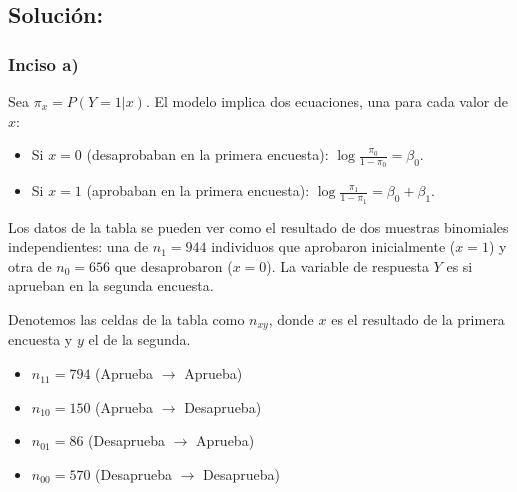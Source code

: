 \documentclass[paper=letter, fontsize=11pt]{scrartcl}\usepackage[]{graphicx}\usepackage[]{xcolor}
\numberwithin{equation}{problemcounter} %
\numberwithin{figure}{problemcounter} %
\numberwithin{table}{problemcounter} %
\numberwithin{subsection}{problemcounter}
\begin{document}
\subsection{\textbf{Solución:}}

\subsubsection*{Inciso a)}

Sea $\pi_x = P(Y=1|x)$. El modelo implica dos ecuaciones, una para cada valor de $x$:
\begin{itemize}
    \item Si $x=0$ (desaprobaban en la primera encuesta): $\log \frac{\pi_0}{1-\pi_0} = \beta_0$.
    \item Si $x=1$ (aprobaban en la primera encuesta): $\log \frac{\pi_1}{1-\pi_1} = \beta_0 + \beta_1$.
\end{itemize}

Los datos de la tabla se pueden ver como el resultado de dos muestras binomiales independientes: una de $n_1=944$ individuos que aprobaron inicialmente ($x=1$) y otra de $n_0=656$ que desaprobaron ($x=0$). La variable de respuesta $Y$ es si aprueban en la segunda encuesta.

Denotemos las celdas de la tabla como $n_{xy}$, donde $x$ es el resultado de la primera encuesta y $y$ el de la segunda.
\begin{itemize}
    \item $n_{11} = 794$ (Aprueba $\rightarrow$ Aprueba)
    \item $n_{10} = 150$ (Aprueba $\rightarrow$ Desaprueba)
    \item $n_{01} = 86$ (Desaprueba $\rightarrow$ Aprueba)
    \item $n_{00} = 570$ (Desaprueba $\rightarrow$ Desaprueba)
\end{itemize}
\end{document}
